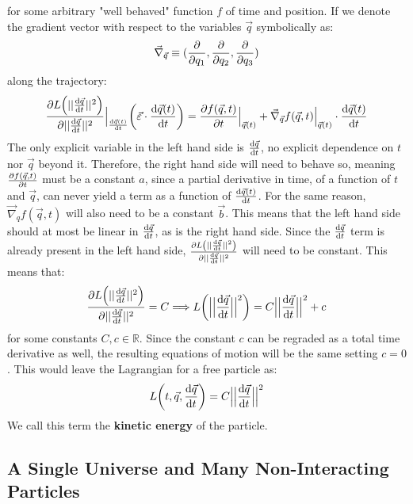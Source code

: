 \documentclass[11pt, a4paper]{article} %
\newcommand{\R}{\mathbb{R}} %
\begin{document}
for some arbitrary "well behaved" function $f$ of time and position. If we denote the gradient vector with respect to the variables $\vec{q}$ symbolically as:
\begin{equation}
\vec{\nabla}_{\vec{q}}\equiv(\pdv{}{q_1},\pdv{}{q_2}, \pdv{}{q_3})
\end{equation}
along the trajectory:
\begin{equation}
\pdv{L\qty(||\dv{\vec{q}}{t}||^2)}{||\dv{\vec{q}}{t}||^2}\Big\rvert_{\dv{\vec{q}(t)}{t}}\qty( \vec{\varepsilon}\cdot \dv{\vec{q}(t)}{t})=\pdv{f(\vec{q},t)}{t}\Big\rvert_{\vec{q}(t)}+\vec{\nabla}_{\vec{q}}f(\vec{q},t)\Big\rvert_{\vec{q}(t)}\cdot \dv{\vec{q}(t)}{t}
\end{equation}
The only explicit variable in the left hand side is $\dv{\vec{q}}{t}$, no explicit dependence on $t$ nor $\vec{q}$ beyond it. Therefore, the right hand side will need to behave so, meaning $\pdv{f(\vec{q},t)}{t}$ must be a constant $a$, since a partial derivative in time, of a function of $t$ and $\vec{q}$, can never yield a term as a function of $\dv{\vec{q}(t)}{t}$. For the same reason, $\vec{\nabla}_qf(\vec{q},t)$ will also need to be a constant $\vec{b}$. This means that the left hand side should at most be linear in $\dv{\vec{q}}{t}$, as is the right hand side. Since the $\dv{\vec{q}}{t}$ term is already present in the left hand side, $\pdv{L\qty(||\dv{\vec{q}}{t}||^2)}{||\dv{\vec{q}}{t}||^2}$ will need to be constant. This means that:
\begin{equation}
\pdv{L\qty(||\dv{\vec{q}}{t}||^2)}{||\dv{\vec{q}}{t}||^2}=C \Longrightarrow L\qty(\Big|\Big|\dv{\vec{q}}{t}\Big|\Big|^2) = C\Big|\Big|\dv{\vec{q}}{t}\Big|\Big|^2+c
\end{equation}
for some constants $C,c\in\R$. Since the constant $c$ can be regraded as a total time derivative as well, the resulting equations of motion will be the same setting $c=0$. This would leave the Lagrangian for a free particle as:
\begin{equation}
L\qty(t, \vec{q}, \dv{\vec{q}}{t})=C\Big|\Big|\dv{\vec{q}}{t}\Big|\Big|^2
\end{equation}
We call this term the {\bf kinetic energy} of the particle.

\subsection*{A Single Universe and Many Non-Interacting Particles}
\end{document}
